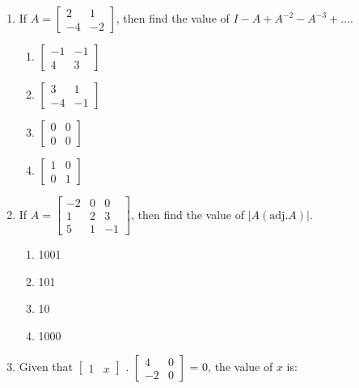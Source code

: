 \documentclass{article}
\begin{document}
\begin{enumerate}[label=\textbf{\arabic*.}]
    \item If \( A = \begin{bmatrix}
    2 & 1 \\
    -4 & -2
    \end{bmatrix} \), then find the value of \( I - A + A^{-2} - A^{-3} + \ldots \).

    \begin{enumerate}[label=\alph*)] %
        \item \(\begin{bmatrix}
        -1 & -1 \\
        4 & 3
        \end{bmatrix} \)
        \item \( \begin{bmatrix}
        3 & 1 \\
        -4 & -1
        \end{bmatrix} \)
        \item \( \begin{bmatrix}
        0 & 0 \\
        0 & 0
        \end{bmatrix} \)
        \item \( \begin{bmatrix}
        1 & 0 \\
        0 & 1
        \end{bmatrix} \)
    \end{enumerate}

    \item If \( A = \begin{bmatrix}
    -2 & 0 & 0 \\
    1 & 2 & 3 \\
    5 & 1 & -1
    \end{bmatrix} \), then find the value of \( |A (\text{adj}.A)| \).

    \begin{enumerate}[label=\alph*)] %
        \item 1001
        \item 101
        \item 10
        \item 1000
    \end{enumerate}

    \item Given that \( \begin{bmatrix}
    1 & x 
    \end{bmatrix} \) . \( \begin{bmatrix}
        4 & 0 \\
        -2 & 0
        \end{bmatrix} \) = 0, the value of \( x \) is:


\end{enumerate}
\end{document}
